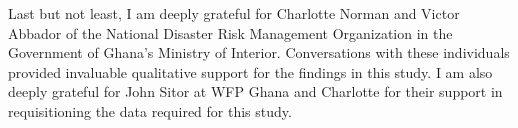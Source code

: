 \documentclass[masters]{ucbthesis}
\begin{document}
\begin{frontmatter}
\begin{acknowledgements}
Last but not least, I am deeply grateful for Charlotte Norman and Victor Abbador of the National Disaster Risk Management Organization in the Government of Ghana’s Ministry of Interior. Conversations with these individuals provided invaluable qualitative support for the findings in this study. I am also deeply grateful for John Sitor at WFP Ghana and Charlotte for their support in requisitioning the data required for this study.
\end{acknowledgements}

\end{frontmatter}

\pagestyle{headings}













\printbibliography

\end{document}
